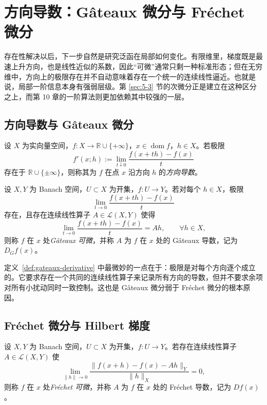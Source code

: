 \section{方向导数：Gâteaux 微分与 Fréchet 微分}

\label{sec:5-2}

存在性解决以后，下一步自然是研究泛函在局部如何变化。有限维里，梯度既是最速上升方向，也是线性近似的系数，因此“可微”通常只剩一种标准形态；但在无穷维中，方向上的极限存在并不自动意味着存在一个统一的连续线性逼近。也就是说，局部一阶信息本身有强弱层级。第 \ref{sec:5-3} 节的次微分正是建立在这种区分之上，而第 10 章的一阶算法则更加依赖其中较强的一层。

\subsection{方向导数与 Gâteaux 微分}

\begin{definition}[方向导数]\label{def:directional-derivative}
设 $X$ 为实向量空间，$f\colon X\to \mathbb R\cup\{+\infty\}$，$x\in \operatorname{dom}f$，$h\in X$。若极限
\[
f'(x;h):=\lim_{t\downarrow 0}\frac{f(x+th)-f(x)}{t}
\]
存在于 $\mathbb R\cup\{\pm\infty\}$，则称其为 $f$ 在点 $x$ 沿方向 $h$ 的\emph{方向导数}。
\end{definition}

\begin{definition}[Gâteaux 微分]\label{def:gateaux-derivative}
设 $X,Y$ 为 Banach 空间，$U\subset X$ 为开集，$f\colon U\to Y$。若对每个 $h\in X$，极限
\[
\lim_{t\to 0}\frac{f(x+th)-f(x)}{t}
\]
存在，且存在连续线性算子 $A\in \mathcal L(X,Y)$ 使得
\[
\lim_{t\to 0}\frac{f(x+th)-f(x)}{t}=Ah,\qquad \forall h\in X,
\]
则称 $f$ 在 $x$ 处\emph{Gâteaux 可微}，并称 $A$ 为 $f$ 在 $x$ 处的 Gâteaux 导数，记为 $D_Gf(x)$。
\end{definition}

\begin{remark}
定义~\ref{def:gateaux-derivative} 中最微妙的一点在于：极限是对每个方向逐个成立的。它要求存在一个共同的连续线性算子来记录所有方向的导数，但并不要求余项对所有小扰动同时一致控制。这也是 Gâteaux 微分弱于 Fréchet 微分的根本原因。
\end{remark}

\subsection{Fréchet 微分与 Hilbert 梯度}

\begin{definition}[Fréchet 微分]\label{def:frechet-derivative}
设 $X,Y$ 为 Banach 空间，$U\subset X$ 为开集，$f\colon U\to Y$。若存在连续线性算子 $A\in\mathcal L(X,Y)$ 使
\[
\lim_{\|h\|\to 0}\frac{\|f(x+h)-f(x)-Ah\|_Y}{\|h\|_X}=0,
\]
则称 $f$ 在 $x$ 处\emph{Fréchet 可微}，并称 $A$ 为 $f$ 在 $x$ 处的 Fréchet 导数，记为 $Df(x)$。
\end{definition}

